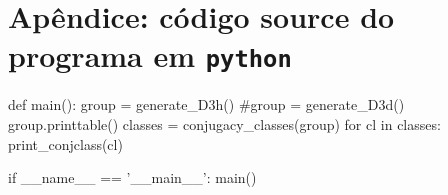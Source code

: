\documentclass[a4paper,10pt]{article}
\newcommand{\python}[1]{\texttt{#1}}
\begin{document}
\section*{Apêndice: código source do programa em \python{python}}

\begin{Python}
def main():
    group = generate_D3h()
    #group = generate\_D3d()
    group.printtable()
    classes = conjugacy_classes(group)
    for cl in classes:
        print_conjclass(cl)

if __name__ == '__main__':
    main()
\end{Python}
\end{document}
